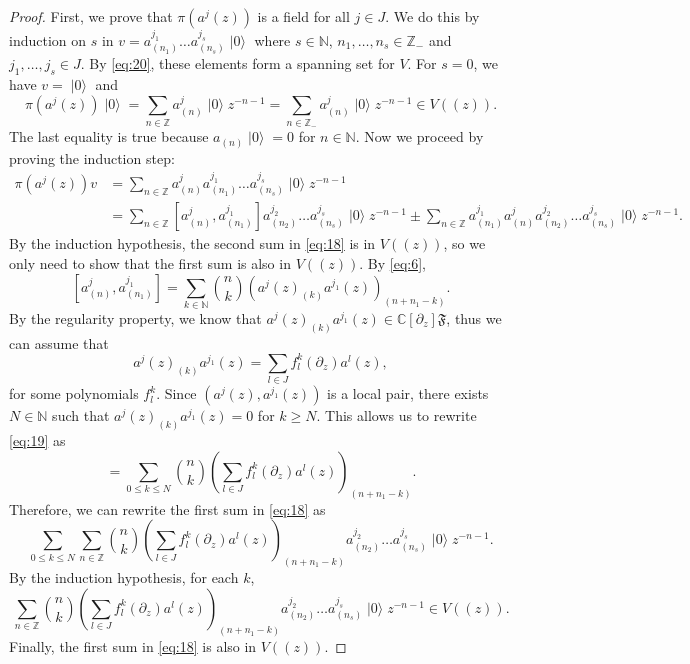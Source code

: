 \documentclass[a4paper, 12pt, reqno]{amsart}
\theoremstyle{remark}
\numberwithin{equation}{subsection}
\DeclareMathOperator{\vac}{|0\rangle}
\begin{document}
\begin{proof}
  First, we prove that $\pi(a^j(z))$ is a field for all $j \in J$.
  We do this by induction on $s$ in $v = a^{j_1}_{(n_1)}\dots a^{j_s}_{(n_s)}\vac$ where $s \in \mathbb{N}$, $n_1, \dots, n_s \in \mathbb{Z}_-$ and $j_1, \dots, j_s \in J$.
  By \eqref{eq:20}, these elements form a spanning set for $V$.
  For $s = 0$, we have $v = \vac$ and
  \begin{equation*}
    \pi(a^j(z))\vac = \sum_{n \in \mathbb{Z}} a^j_{(n)}\vac z^{-n - 1} = \sum_{n \in \mathbb{Z}_-} a^j_{(n)}\vac z^{-n - 1} \in V((z)).
  \end{equation*}
  The last equality is true because $a_{(n)}\vac = 0$ for $n \in \mathbb{N}$.
  Now we proceed by proving the induction step:
  \begin{align}
    \nonumber
    \pi(a^j(z))v &= \sum_{n \in \mathbb{Z}}a^j_{(n)}a^{j_1}_{(n_1)}\dots a^{j_s}_{(n_s)}\vac z^{-n - 1} \\
    \label{eq:18}
    &= \sum_{n \in \mathbb{Z}} [a^j_{(n)}, a^{j_1}_{(n_1)}]a^{j_2}_{(n_2)}\dots a^{j_s}_{(n_s)}\vac z^{-n - 1} \pm \sum_{n \in \mathbb{Z}}a^{j_1}_{(n_1)}a^j_{(n)}a^{j_2}_{(n_2)}\dots a^{j_s}_{(n_s)}\vac z^{-n - 1}.
  \end{align}
  By the induction hypothesis, the second sum in \eqref{eq:18} is in $V((z))$, so we only need to show that the first sum is also in $V((z))$.
  By \eqref{eq:6},
  \begin{equation}
    \label{eq:19}
    [a^j_{(n)}, a^{j_1}_{(n_1)}] = \sum_{k \in \mathbb{N}}\binom{n}{k}(a^j(z)_{(k)}a^{j_1}(z))_{(n + n_1 - k)}.
  \end{equation}
  By the regularity property, we know that $a^j(z)_{(k)}a^{j_1}(z) \in \mathbb{C}[\partial_z]\mathfrak{F}$, thus we can assume that
  \begin{equation*}
    a^j(z)_{(k)}a^{j_1}(z) = \sum_{l \in J}f^k_l(\partial_z)a^l(z),
  \end{equation*}
  for some polynomials $f^k_l$.
  Since $(a^j(z), a^{j_1}(z))$ is a local pair, there exists $N \in \mathbb{N}$ such that $a^j(z)_{(k)}a^{j_1}(z) = 0$ for $k \ge N$.
  This allows us to rewrite \eqref{eq:19} as
  \begin{equation*}
    [a^j_{(n)}, a^{j_1}_{(n_1)}] = \sum_{0 \le k \le N}\binom{n}{k}\left(\sum_{l \in J}f^k_l(\partial_z)a^l(z)\right)_{(n + n_1 - k)}.
  \end{equation*}
  Therefore, we can rewrite the first sum in \eqref{eq:18} as
  \begin{equation*}
    \sum_{0 \le k \le N}\sum_{n \in \mathbb{Z}}\binom{n}{k}\left(\sum_{l \in J}f^k_l(\partial_z)a^l(z)\right)_{(n + n_1 - k)}a^{j_2}_{(n_2)}\dots a^{j_s}_{(n_s)}\vac z^{-n - 1}.
  \end{equation*}
  By the induction hypothesis, for each $k$,
  \begin{equation*}
    \sum_{n \in \mathbb{Z}}\binom{n}{k}\left(\sum_{l \in J}f^k_l(\partial_z)a^l(z)\right)_{(n + n_1 - k)}a^{j_2}_{(n_2)}\dots a^{j_s}_{(n_s)}\vac z^{-n - 1} \in V((z)).
  \end{equation*}
  Finally, the first sum in \eqref{eq:18} is also in $V((z))$.


\end{proof}
\end{document}
